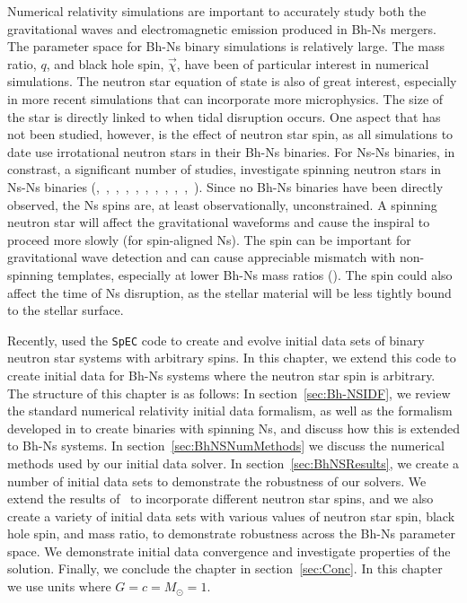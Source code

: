 Numerical relativity simulations are important to accurately study
both the gravitational waves and electromagnetic emission produced in
Bh-Ns mergers.  The parameter space for Bh-Ns binary simulations is
relatively large. The mass ratio, $q$, and black hole spin, $\vec{\chi}$, have been of particular interest in numerical simulations. 
The neutron star equation of state is also of
great interest, especially in more recent simulations that can
incorporate more microphysics.  The size of the star is directly
linked to when tidal disruption occurs. One aspect that has not been
studied, however, is the effect of neutron star spin, as all
simulations to date use irrotational neutron stars in their Bh-Ns
binaries. For Ns-Ns binaries, in constrast, a significant number of
studies, investigate spinning neutron stars in Ns-Ns binaries
(\cite{Baumgarte:2009fw},~\cite{Tichy:2011gw},~\cite{East:2012zn},~\cite{Tichy:2012rp},~\cite{Bernuzzi:2013rza},~\cite{Kastaun:2013mv},~\cite{Tsatsin:2013jca},~\cite{Dietrich:2015pxa},~\cite{East:2015yea},~\cite{Tsokaros:2015fea},~\cite{Tacik:2015tja}). Since
no Bh-Ns binaries have been directly observed, the Ns spins are, at
least observationally, unconstrained. A spinning neutron star will affect the gravitational waveforms and cause the inspiral to proceed more slowly (for spin-aligned Ns). The spin can be important for gravitational wave detection and can cause appreciable mismatch with non-spinning templates, especially at lower Bh-Ns mass ratios (\cite{Ajith:2011ec}). The spin could also affect the time of Ns disruption, as the stellar material will be less tightly bound to the stellar surface.

Recently, \cite{Tacik:2015tja} used the {\tt SpEC} code to create and
evolve initial data sets of binary neutron star systems with arbitrary
spins. In this chapter, we extend this code to create initial data for
Bh-Ns systems where the neutron star spin is arbitrary. The structure of this
chapter is as follows: In section~\ref{sec:Bh-NSIDF}, we review the standard numerical relativity initial data formalism, as well as the formalism
developed in \cite{Tichy:2011gw} to create binaries with spinning Ns,
and discuss how this is extended to Bh-Ns systems. In section~\ref{sec:BhNSNumMethods} we discuss the numerical methods used by our initial data solver.
In section~\ref{sec:BhNSResults}, we create a number of initial data sets to demonstrate the robustness of our solvers. We extend the results of~\cite{Foucart:2013a} to incorporate different neutron star spins,
and we also create a variety of initial data sets with various values
of neutron star spin, black hole spin, and mass ratio, to demonstrate
robustness across the Bh-Ns parameter space. We demonstrate initial
data convergence and investigate properties of the solution. Finally,
we conclude the chapter in section~\ref{sec:Conc}.
In this chapter we use units where $G=c=M_{\odot}=1$.

